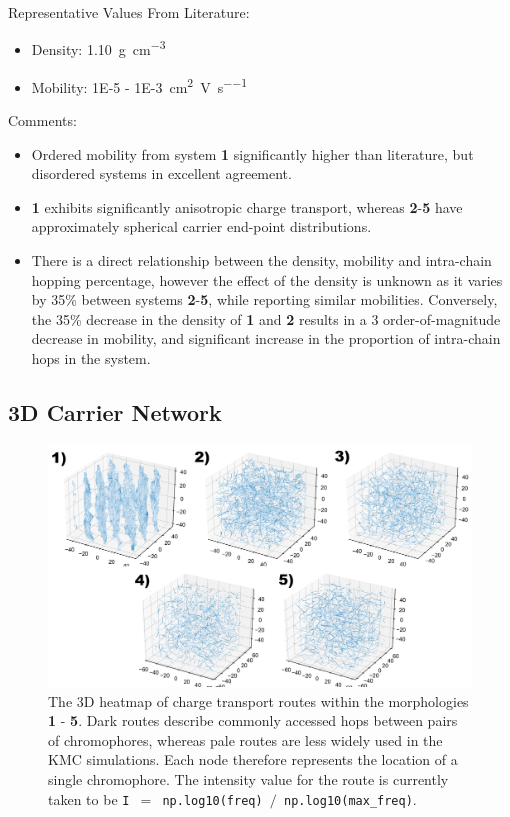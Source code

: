 \documentclass[12pt]{article}
\def\mobunits{\square\centi\meter\per\volt\per\second}
\def\gcm{\gram\per\cubic\centi\meter}
\begin{document}
Representative Values From Literature:
\begin{itemize}
    \item{Density: \SI{1.10}{\gcm}\cite{Newbloom2012a}}
\item{Mobility: \SI{1E-5}{} - \SI{1E-3}{\mobunits}\cite{Ballantyne2008b,Mauer2010,Pandey2000,Kim2006}}
\end{itemize}

Comments:
\begin{itemize}
    \item{Ordered mobility from system \textbf{1} significantly higher than literature, but disordered systems in excellent agreement.}
    \item{\textbf{1} exhibits significantly anisotropic charge transport, whereas \textbf{2}-\textbf{5} have approximately spherical carrier end-point distributions.}
    \item{There is a direct relationship between the density, mobility and intra-chain hopping percentage, however the effect of the density is unknown as it varies by 35\% between systems \textbf{2}-\textbf{5}, while reporting similar mobilities.
            Conversely, the 35\% decrease in the density of \textbf{1} and \textbf{2} results in a 3 order-of-magnitude decrease in mobility, and significant increase in the proportion of intra-chain hops in the system.}
\end{itemize}

\subsection{3D Carrier Network}

\begin{figure}[h!]\centering
	\includegraphics[width=\textwidth]{Figures/3dHole.pdf}
    \caption{The 3D heatmap of charge transport routes within the morphologies \textbf{1} - \textbf{5}.
    Dark routes describe commonly accessed hops between pairs of chromophores, whereas pale routes are less widely used in the KMC simulations.
    Each node therefore represents the location of a single chromophore.
The intensity value for the route is currently taken to be \texttt{I $=$ np.log10(freq) $/$ np.log10(max\_freq)}.}
	\label{fig:3dNetwork}
\end{figure}
\end{document}
